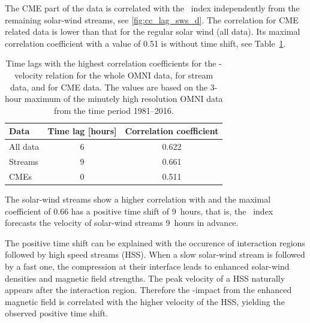 The CME part of the data is correlated with the \Kp~index independently from the remaining solar-wind streams, see \autoref{fig:cc_lag_sws_d}. The correlation for CME related data is lower than that for the regular solar wind (all data). Its maximal correlation coefficient with a value of 0.51 is without time shift, see Table~\ref{tab:correlation_coefficients_kpvsv}.
\begin{table}
	\caption{Time lags with the highest correlation coefficients for the \Kp{}-velocity relation for the whole OMNI data, for stream data, and for CME data. The values are based on the 3-hour maximum of the minutely high resolution OMNI data from the time period 1981--2016.}
	\label{tab:correlation_coefficients_kpvsv}
	\centering
	\begin{tabular}{lcc}
		\hline\hline
		Data	&Time lag [hours]	&Correlation coefficient\\
		\hline
		All data	&6	&0.622\\
		Streams	&9	&0.661\\
		CMEs	&0	&0.511\\
		\hline
	\end{tabular}
\end{table}
% 
The solar-wind streams show a higher correlation with \Kp{} and the maximal coefficient of 0.66 has a positive time shift of 9~hours, that is, the \Kp~index forecasts the velocity of solar-wind streams 9~hours in advance.

The positive time shift can be explained with the occurence of interaction regions followed by high speed streams (HSS). When a slow solar-wind stream is followed by a fast one, the compression at their interface leads to enhanced solar-wind densities and magnetic field strengths. The peak velocity of a HSS naturally appears after the interaction region. Therefore the \Kp-impact from the enhanced magnetic field is correlated with the higher velocity of the HSS, yielding the observed positive time shift.

